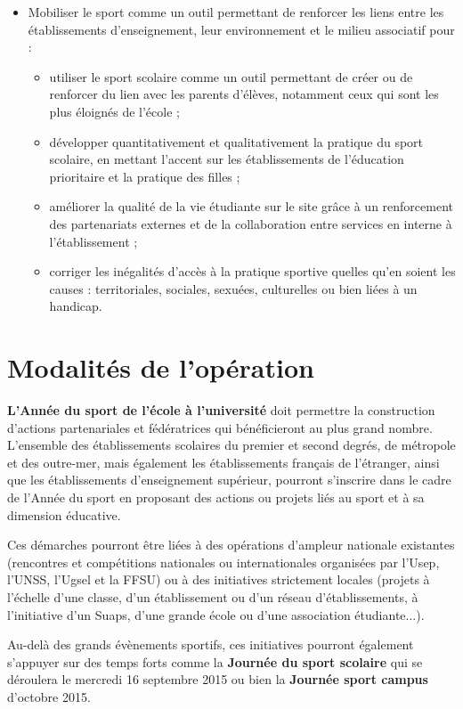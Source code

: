 \begin{itemize}
\item Mobiliser le sport comme un outil permettant de renforcer les liens entre les établissements d’enseignement, leur environnement et le milieu associatif pour :
	\begin{itemize}
	\item utiliser le sport scolaire comme un outil permettant de créer ou de renforcer du lien avec les parents d’élèves, notamment ceux qui sont les plus éloignés de l’école ;
	\item développer quantitativement et qualitativement la pratique du sport scolaire, en mettant l’accent sur les établissements de l’éducation prioritaire et la pratique des filles ;
	\item améliorer la qualité de la vie étudiante sur le site grâce à un renforcement des partenariats externes et de la collaboration entre services en interne à l’établissement ;
	\item corriger les inégalités d’accès à la pratique sportive quelles qu’en soient les causes : territoriales, sociales, sexuées, culturelles ou bien liées à un handicap.
	\end{itemize}
\end{itemize}
    
\section{Modalités de l’opération}
\textbf{L’Année du sport de l’école à l’université} doit permettre la construction d’actions partenariales et fédératrices qui bénéficieront au plus grand nombre. L’ensemble des établissements scolaires du premier et second degrés, de métropole et des outre-mer, mais également les établissements français de l’étranger, ainsi que les établissements d’enseignement supérieur, pourront s’inscrire dans le cadre de l’Année du sport en proposant des actions ou projets liés au sport et à sa dimension éducative.

Ces démarches pourront être liées à des opérations d’ampleur nationale existantes (rencontres et compétitions nationales ou internationales organisées par l’Usep, l’UNSS, l’Ugsel et la FFSU) ou à des initiatives strictement locales (projets à l’échelle d’une classe, d’un établissement ou d’un réseau d’établissements, à l’initiative d’un Suaps, d’une grande école ou d’une association étudiante...).

Au-delà des grands évènements sportifs, ces initiatives pourront également s’appuyer sur des temps forts comme la \textbf{Journée du sport scolaire} qui se déroulera le mercredi 16 septembre 2015 ou bien la \textbf{Journée sport campus} d’octobre 2015.

